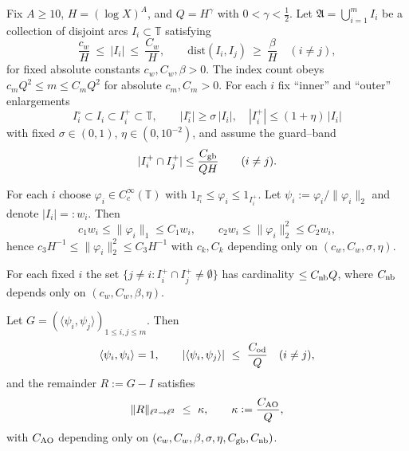 \begin{definition}\label{def:bank-geometry}
Fix $A\ge10$, $H=(\log X)^A$, and $Q=H^\gamma$ with $0<\gamma<\tfrac12$.
Let $\mathfrak A=\bigcup_{i=1}^{m} I_i$ be a collection of disjoint arcs $I_i\subset\mathbb T$ satisfying
\begin{equation}\label{eq:bank-geom}
\frac{c_w}{H}\ \le\ |I_i|\ \le\ \frac{C_w}{H},\qquad 
\mathrm{dist}(I_i,I_j)\ \ge\ \frac{\beta}{H}\quad (i\neq j),
\end{equation}
for fixed absolute constants $c_w,C_w,\beta>0$. 
The index count obeys $c_m Q^2\le m\le C_m Q^2$ for absolute $c_m,C_m>0$.
For each $i$ fix “inner” and “outer” enlargements
\[
I_i^\circ \subset I_i \subset I_i^+\subset \mathbb T,\qquad |I_i^\circ|\ge \sigma\,|I_i|,\quad |I_i^+|\le (1+\eta)\,|I_i|
\]
with fixed $\sigma\in(0,1)$, $\eta\in(0,10^{-2})$, and assume the guard–band
\begin{equation}\label{eq:guard-band}
|I_i^+\cap I_j^+| \le \frac{C_{\rm gb}}{QH}\qquad (i\neq j).
\end{equation}
\end{definition}

\begin{lemma}\label{lem:detectors}
For each $i$ choose $\varphi_i\in C_c^\infty(\mathbb T)$ with $1_{I_i^\circ}\le \varphi_i \le 1_{I_i^+}$.
Let $\psi_i:=\varphi_i/\|\varphi_i\|_2$ and denote $|I_i|=:w_i$.
Then
\[
c_1 w_i \le \|\varphi_i\|_1 \le C_1 w_i,\qquad c_2 w_i \le \|\varphi_i\|_2^2 \le C_2 w_i,
\]
hence $c_3 H^{-1}\le \|\varphi_i\|_2^2\le C_3 H^{-1}$ with $c_k,C_k$ depending only on $(c_w,C_w,\sigma,\eta)$.
\end{lemma}

\begin{lemma}\label{lem:overlap}
For each fixed $i$ the set $\{j\ne i: I_i^+\cap I_j^+\neq\emptyset\}$ has cardinality $\le C_{\rm nb} Q$, where $C_{\rm nb}$ depends only on $(c_w,C_w,\beta,\eta)$.
\end{lemma}

\begin{lemma}\label{lem:gram}
Let $G=(\langle\psi_i,\psi_j\rangle)_{1\le i,j\le m}$.
Then
\[
\langle\psi_i,\psi_i\rangle=1,\qquad 
|\langle\psi_i,\psi_j\rangle|\ \le\ \frac{C_{\rm od}}{Q}\quad(i\ne j),
\]
and the remainder $R:=G-I$ satisfies
\[
\|R\|_{\ell^2\to\ell^2}\ \le\ \kappa,\qquad \kappa:=\frac{C_{\rm AO}}{Q},
\]
with $C_{\rm AO}$ depending only on $(c_w,C_w,\beta,\sigma,\eta,C_{\rm gb},C_{\rm nb})$.
\end{lemma}

